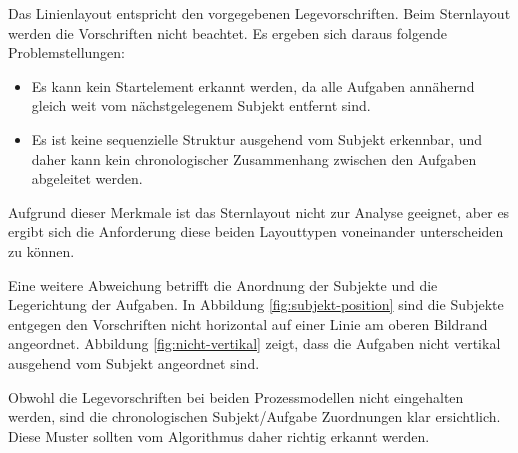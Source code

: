 Das Linienlayout entspricht den vorgegebenen Legevorschriften. Beim Sternlayout werden die Vorschriften nicht beachtet. Es ergeben sich daraus folgende Problemstellungen:
\begin{itemize}
	\item Es kann kein Startelement erkannt werden, da alle Aufgaben annähernd gleich weit vom nächstgelegenem Subjekt entfernt sind.
	\item Es ist keine sequenzielle Struktur ausgehend vom Subjekt erkennbar, und daher kann kein chronologischer Zusammenhang zwischen den Aufgaben abgeleitet werden.
\end{itemize}

Aufgrund dieser Merkmale ist das Sternlayout nicht zur Analyse geeignet, aber es ergibt sich die Anforderung diese beiden Layouttypen voneinander unterscheiden zu können.

Eine weitere Abweichung betrifft die Anordnung der Subjekte und die Legerichtung der Aufgaben. In Abbildung \ref{fig:subjekt-position} sind die Subjekte entgegen den Vorschriften nicht horizontal auf einer Linie am oberen Bildrand angeordnet. Abbildung \ref{fig:nicht-vertikal} zeigt, dass die Aufgaben nicht vertikal ausgehend vom Subjekt angeordnet sind.

Obwohl die Legevorschriften bei beiden Prozessmodellen nicht eingehalten werden, sind die chronologischen Subjekt/Aufgabe Zuordnungen klar ersichtlich. Diese Muster sollten vom Algorithmus daher richtig erkannt werden. 

